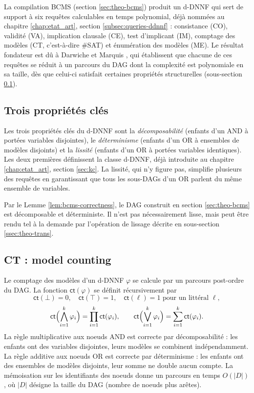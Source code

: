 \documentclass[11pt,a4paper]{report}
\theoremstyle{plain}
\theoremstyle{definition}
\begin{document}
La compilation BCMS (section \ref{sec:theo-bcms}) produit un d-DNNF
qui sert de support à six requêtes calculables en temps polynomial,
déjà nommées au chapitre \ref{chap:etat_art},
section \ref{subsec:queries-ddnnf} : consistance (CO), validité (VA),
implication clausale (CE), test d'implicant (IM), comptage des
modèles (CT, c'est-à-dire \#SAT) et énumération des modèles (ME). Le
résultat fondateur est dû à Darwiche et Marquis \cite{darwiche2002},
qui établissent que chacune de ces requêtes se réduit à un parcours
du DAG dont la complexité est polynomiale en sa taille, dès que
celui-ci satisfait certaines propriétés structurelles
(sous-section \ref{ssec:theo-properties}).

\subsection{Trois propriétés clés}
\label{ssec:theo-properties}

Les trois propriétés clés du d-DNNF sont la \emph{décomposabilité}
(enfants d'un AND à portées variables disjointes), le
\emph{déterminisme} (enfants d'un OR à ensembles de modèles disjoints)
et la \emph{lissité} (enfants d'un OR à portées variables identiques).
Les deux premières définissent la classe d-DNNF, déjà introduite au
chapitre \ref{chap:etat_art}, section \ref{sec:kc}. La lissité, qui
n'y figure pas, simplifie plusieurs des requêtes en garantissant que
tous les sous-DAGs d'un OR parlent du même ensemble de variables.

Par le Lemme \ref{lem:bcms-correctness}, le DAG construit en
section \ref{sec:theo-bcms} est décomposable et déterministe. Il n'est
pas nécessairement lisse, mais peut être rendu tel à la demande par
l'opération de lissage décrite en sous-section \ref{ssec:theo-trans}.

\subsection{CT : model counting}
\label{ssec:theo-ct}

Le comptage des modèles d'un d-DNNF $\varphi$ se calcule par un
parcours post-ordre du DAG. La fonction $\mathsf{ct}(\varphi)$ se
définit récursivement par
\[
  \mathsf{ct}(\bot) = 0,
  \quad
  \mathsf{ct}(\top) = 1,
  \quad
  \mathsf{ct}(\ell) = 1 \text{ pour un littéral } \ell,
\]
\[
  \mathsf{ct}\Bigl(\bigwedge_{i=1}^{k} \varphi_i\Bigr) = \prod_{i=1}^{k} \mathsf{ct}(\varphi_i),
  \qquad
  \mathsf{ct}\Bigl(\bigvee_{i=1}^{k} \varphi_i\Bigr) = \sum_{i=1}^{k} \mathsf{ct}(\varphi_i).
\]
La règle multiplicative aux noeuds AND est correcte par
décomposabilité : les enfants ont des variables disjointes, leurs
modèles se combinent indépendamment. La règle additive aux noeuds OR
est correcte par déterminisme : les enfants ont des ensembles de
modèles disjoints, leur somme ne double aucun compte. La mémoisation
sur les identifiants des noeuds donne un parcours en temps $O(|D|)$, où
$|D|$ désigne la taille du DAG (nombre de noeuds plus arêtes).
\end{document}
